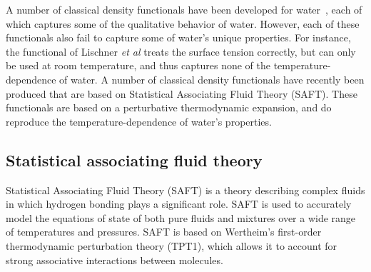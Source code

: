 \documentclass[letterpaper,twocolumn,amsmath,amssymb,prb]{revtex4-1}
\begin{document}
A number of classical density functionals have been developed for
water~\cite{ding1987, Yang1992, yang1994density, gloor2002saft,gloor2004accurate,
  gloor2007prediction, Jaqaman2004, clark2006developing,
  lischner2010classical, fu2005vapor-liquid-dft,
  blas2001examination}, each of which
captures some of the qualitative behavior of water.  However, each of
these functionals also fail to capture some of water's unique
properties.  For instance, the functional of Lischner \emph{et
  al}\cite{lischner2010classical} treats the surface tension
correctly, but can only be used at room temperature, and thus captures
none of the temperature-dependence of water.  A number of classical
density functionals have recently been produced that are based on
Statistical Associating Fluid Theory (SAFT)\cite{ 
  yu2002fmt-dft-inhomogeneous-associating,
  fu2005vapor-liquid-dft,gloor2002saft,
  clark2006developing, gloor2007prediction, gloor2004accurate,
  gross2009density, kahl2008modified, blas2001examination}.  These
functionals are based on a perturbative thermodynamic expansion, and
do reproduce the temperature-dependence of water's properties.

\subsection{Statistical associating fluid theory}

Statistical Associating Fluid Theory (SAFT) is a theory describing
complex fluids in which hydrogen bonding plays a significant
role\cite{muller2001molecular}.  SAFT is used to accurately model the
equations of state of both pure fluids and mixtures over a wide range
of temperatures and pressures.  SAFT is
based on Wertheim's first-order thermodynamic perturbation theory
(TPT1)\cite{wertheim1984fluidsI, wertheim1984fluidsII,
  wertheim1986fluidsIII, wertheim1986fluidsIV}, which allows it to
account for strong associative interactions between molecules.
\end{document}
